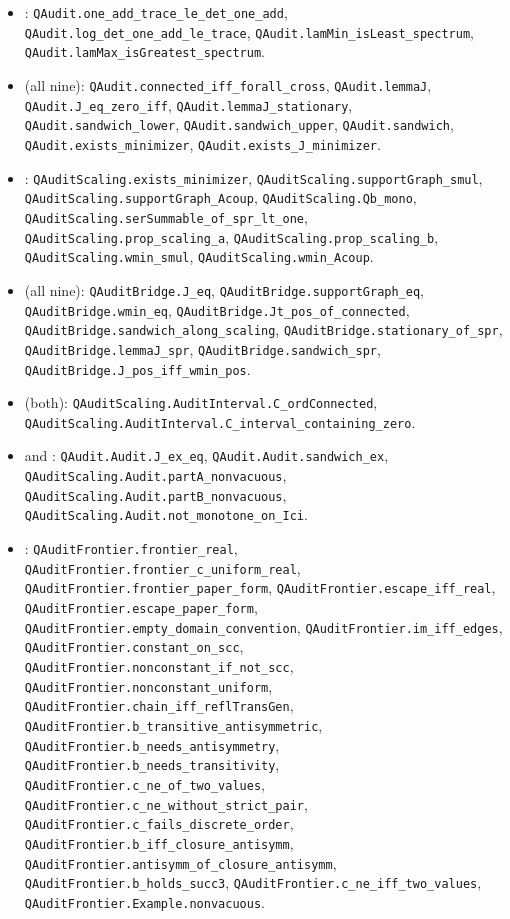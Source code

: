 \begin{itemize}\raggedright
\item {}: \texttt{QAudit.one\_add\_trace\_le\_det\_one\_add}, \texttt{QAudit.log\_det\_one\_add\_le\_trace}, \texttt{QAudit.lamMin\_isLeast\_spectrum}, \texttt{QAudit.lamMax\_isGreatest\_spectrum}.
\item {} (all nine): \texttt{QAudit.connected\_iff\_forall\_cross}, \texttt{QAudit.lemmaJ}, \texttt{QAudit.J\_eq\_zero\_iff}, \texttt{QAudit.lemmaJ\_stationary}, \texttt{QAudit.sandwich\_lower}, \texttt{QAudit.sandwich\_upper}, \texttt{QAudit.sandwich}, \texttt{QAudit.exists\_minimizer}, \texttt{QAudit.exists\_J\_minimizer}.
\item {}: \texttt{QAuditScaling.exists\_minimizer}, \texttt{QAuditScaling.supportGraph\_smul}, \texttt{QAuditScaling.supportGraph\_Acoup}, \texttt{QAuditScaling.Qb\_mono}, \texttt{QAuditScaling.serSummable\_of\_spr\_lt\_one}, \texttt{QAuditScaling.prop\_scaling\_a}, \texttt{QAuditScaling.prop\_scaling\_b}, \texttt{QAuditScaling.wmin\_smul}, \texttt{QAuditScaling.wmin\_Acoup}.
\item {} (all nine): \texttt{QAuditBridge.J\_eq}, \texttt{QAuditBridge.supportGraph\_eq}, \texttt{QAuditBridge.wmin\_eq}, \texttt{QAuditBridge.Jt\_pos\_of\_connected}, \texttt{QAuditBridge.sandwich\_along\_scaling}, \texttt{QAuditBridge.stationary\_of\_spr}, \texttt{QAuditBridge.lemmaJ\_spr}, \texttt{QAuditBridge.sandwich\_spr}, \texttt{QAuditBridge.J\_pos\_iff\_wmin\_pos}.
\item {} (both): \texttt{QAuditScaling.AuditInterval.C\_ordConnected}, \texttt{QAuditScaling.AuditInterval.C\_interval\_containing\_zero}.
\item {} and : \texttt{QAudit.Audit.J\_ex\_eq}, \texttt{QAudit.Audit.sandwich\_ex}, \texttt{QAuditScaling.Audit.partA\_nonvacuous}, \texttt{QAuditScaling.Audit.partB\_nonvacuous}, \texttt{QAuditScaling.Audit.not\_monotone\_on\_Ici}.
\item {}: \texttt{QAuditFrontier.frontier\_real}, \texttt{QAuditFrontier.frontier\_c\_uniform\_real}, \texttt{QAuditFrontier.frontier\_paper\_form}, \texttt{QAuditFrontier.escape\_iff\_real}, \texttt{QAuditFrontier.escape\_paper\_form}, \texttt{QAuditFrontier.empty\_domain\_convention}, \texttt{QAuditFrontier.im\_iff\_edges}, \texttt{QAuditFrontier.constant\_on\_scc}, \texttt{QAuditFrontier.nonconstant\_if\_not\_scc}, \texttt{QAuditFrontier.nonconstant\_uniform}, \texttt{QAuditFrontier.chain\_iff\_reflTransGen}, \texttt{QAuditFrontier.b\_transitive\_antisymmetric}, \texttt{QAuditFrontier.b\_needs\_antisymmetry}, \texttt{QAuditFrontier.b\_needs\_transitivity}, \texttt{QAuditFrontier.c\_ne\_of\_two\_values}, \texttt{QAuditFrontier.c\_ne\_without\_strict\_pair}, \texttt{QAuditFrontier.c\_fails\_discrete\_order}, \texttt{QAuditFrontier.b\_iff\_closure\_antisymm}, \texttt{QAuditFrontier.antisymm\_of\_closure\_antisymm}, \texttt{QAuditFrontier.b\_holds\_succ3}, \texttt{QAuditFrontier.c\_ne\_iff\_two\_values}, \texttt{QAuditFrontier.Example.nonvacuous}.
\end{itemize}
